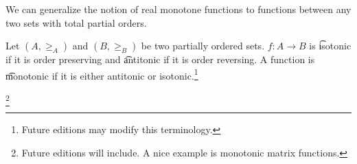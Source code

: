 

We can generalize the notion of real monotone functions to functions between any two sets with total partial orders.


Let $(A, \geq_A)$ and $(B, \geq_B)$ be two partially ordered sets.
$f:A \to B$ is \t{isotonic} if it is order preserving and \t{antitonic} if it is order reversing.
A function is \t{monotonic} if it is either antitonic or isotonic.\footnote{Future editions may modify this terminology.}

\footnote{Future editions will include. A nice example is monotonic matrix functions.}

\blankpage
